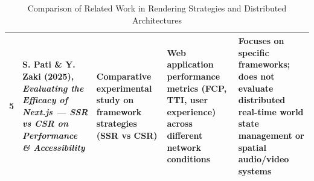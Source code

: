 \documentclass[11pt,a4paper]{article}
\begin{document}
\begin{table}[htbp]
\begin{tabularx}{\textwidth}{|C{0.6cm}|L{3.2cm}|L{3.3cm}|L{3.0cm}|L{3.3cm}|}
5 &
S. Pati \& Y. Zaki (2025), \textit{Evaluating the Efficacy of Next.js — SSR vs CSR on Performance \& Accessibility} &
Comparative experimental study on framework strategies (SSR vs CSR) &
Web application performance metrics (FCP, TTI, user experience) across different network conditions &
Focuses on specific frameworks; does not evaluate distributed real-time world state management or spatial audio/video systems \\
\hline

\end{tabularx}

\caption{Comparison of Related Work in Rendering Strategies and Distributed Architectures}
\label{tab:related_work}
\end{table}
\end{document}
